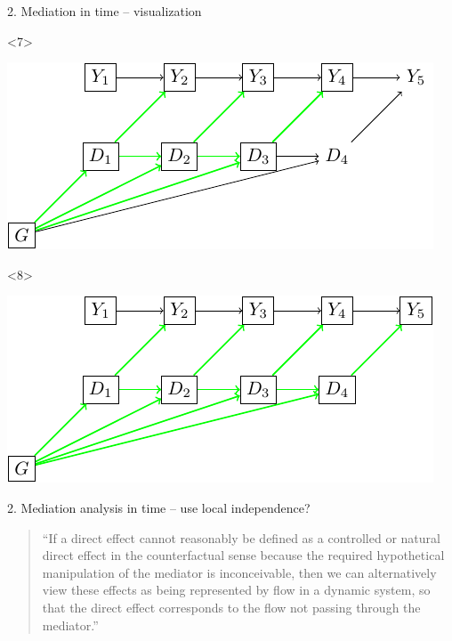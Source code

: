 \documentclass{beamer}\usepackage{listings}
\begin{document}
\begin{frame}[label={sec:org8730378}]{2. Mediation in time -- visualization}
\begin{onlyenv}<7>
\begin{center}
\includegraphics[width=.9\linewidth]{./figs/med-li3.pdf}
\end{center}
\end{onlyenv}

\begin{onlyenv}<8>
\begin{center}
\includegraphics[width=.9\linewidth]{./figs/med-li4.pdf}
\end{center}
\end{onlyenv}
\end{frame}

\begin{frame}[label={sec:org3f5f883}]{2. Mediation analysis in time -- use local independence?}
\begin{quote} %
``If a direct effect cannot reasonably be defined as a controlled or natural direct effect in the
counterfactual sense because the required hypothetical manipulation of the mediator is
inconceivable, then we can alternatively view these effects as being represented by flow in a
dynamic system, so that the direct effect corresponds to the flow not passing through the mediator.''
\citep{aalen2012causality}
\end{quote}
\end{frame}
\end{document}
